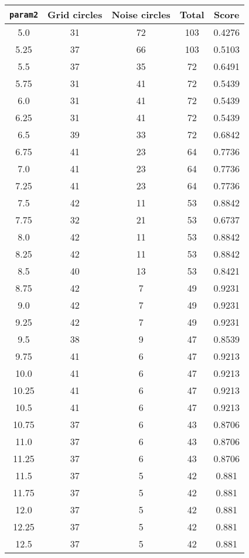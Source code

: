 \documentclass[letterpaper, 12pt]{article}
\begin{document}
\begin{longtable}{|c|c|c|c|c|}
\hline
\textbf{\texttt{param2}} & \textbf{Grid circles} & \textbf{Noise circles} & \textbf{Total} & \textbf{Score} \\
\hline
5.0 & 31 & 72 & 103 & 0.4276 \\
\hline
5.25 & 37 & 66 & 103 & 0.5103 \\
\hline
5.5 & 37 & 35 & 72 & 0.6491 \\
\hline
5.75 & 31 & 41 & 72 & 0.5439 \\
\hline
6.0 & 31 & 41 & 72 & 0.5439 \\
\hline
6.25 & 31 & 41 & 72 & 0.5439 \\
\hline
6.5 & 39 & 33 & 72 & 0.6842 \\
\hline
6.75 & 41 & 23 & 64 & 0.7736 \\
\hline
7.0 & 41 & 23 & 64 & 0.7736 \\
\hline
7.25 & 41 & 23 & 64 & 0.7736 \\
\hline
7.5 & 42 & 11 & 53 & 0.8842 \\
\hline
7.75 & 32 & 21 & 53 & 0.6737 \\
\hline
8.0 & 42 & 11 & 53 & 0.8842 \\
\hline
8.25 & 42 & 11 & 53 & 0.8842 \\
\hline
8.5 & 40 & 13 & 53 & 0.8421 \\
\hline
8.75 & 42 & 7 & 49 & 0.9231 \\
\hline
9.0 & 42 & 7 & 49 & 0.9231 \\
\hline
9.25 & 42 & 7 & 49 & 0.9231 \\
\hline
9.5 & 38 & 9 & 47 & 0.8539 \\
\hline
9.75 & 41 & 6 & 47 & 0.9213 \\
\hline
10.0 & 41 & 6 & 47 & 0.9213 \\
\hline
10.25 & 41 & 6 & 47 & 0.9213 \\
\hline
10.5 & 41 & 6 & 47 & 0.9213 \\
\hline
10.75 & 37 & 6 & 43 & 0.8706 \\
\hline
11.0 & 37 & 6 & 43 & 0.8706 \\
\hline
11.25 & 37 & 6 & 43 & 0.8706 \\
\hline
11.5 & 37 & 5 & 42 & 0.881 \\
\hline
11.75 & 37 & 5 & 42 & 0.881 \\
\hline
12.0 & 37 & 5 & 42 & 0.881 \\
\hline
12.25 & 37 & 5 & 42 & 0.881 \\
\hline
12.5 & 37 & 5 & 42 & 0.881 \\

\end{longtable}
\end{document}
